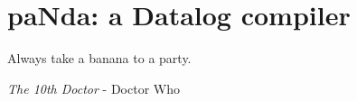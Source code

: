 \chapter{paNda: a Datalog compiler}
\label{chapter:panda}
\epigraph{Always take a banana to a party.}{\textit{The 10th Doctor} - Doctor Who}